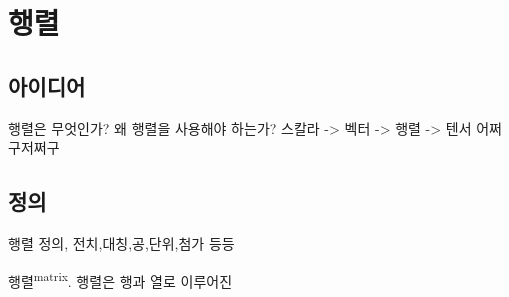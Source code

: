 \documentclass[../note.tex]{subfiles}
\begin{document}
\section{행렬}
\subsection{아이디어}
행렬은 무엇인가? 왜 행렬을 사용해야 하는가?
스칼라 -> 벡터 -> 행렬 -> 텐서
어쩌구저쩌구

\subsection{정의}
행렬 정의, 전치,대칭,공,단위,첨가 등등
\begin{definition}[행렬]

  행렬\textsuperscript{matrix}. 행렬은 행과 열로 이루어진 
\end{definition}
\end{document}
